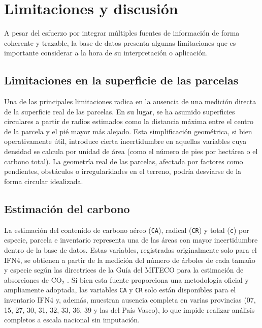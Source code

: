 \section{Limitaciones y discusión}



A pesar del esfuerzo por integrar múltiples fuentes de información de forma coherente y trazable, la base de datos presenta algunas limitaciones que es importante considerar a la hora de su interpretación o aplicación.

\subsection*{Limitaciones en la superficie de las parcelas}

Una de las principales limitaciones radica en la ausencia de una medición directa de la superficie real de las parcelas. En su lugar, se ha asumido superficies circulares a partir de radios estimados como la distancia máxima entre el centro de la parcela y el pié mayor más alejado. Esta simplificación geométrica, si bien operativamente útil, introduce cierta incertidumbre en aquellas variables cuya densidad se calcula por unidad de área (como el número de pies por hectárea o el carbono total). La geometría real de las parcelas, afectada por factores como pendientes, obstáculos o irregularidades en el terreno, podría desviarse de la forma circular idealizada.

\subsection*{Estimación del carbono}

La estimación del contenido de carbono aéreo (\texttt{CA}), radical (\texttt{CR}) y total (\texttt{c}) por especie, parcela e inventario representa una de las áreas con mayor incertidumbre dentro de la base de datos. Estas variables, registradas originalmente solo para el IFN4, se obtienen a partir de la medición del número de árboles de cada tamaño y especie según las directrices de la Guía del MITECO para la estimación de absorciones de CO$_2$ \cite{miteco_guia_co2}. Si bien esta fuente proporciona una metodología oficial y ampliamente adoptada, las variables \texttt{CA} y \texttt{CR} solo están disponibles para el inventario IFN4 y, además, muestran ausencia completa en varias provincias (07, 15, 27, 30, 31, 32, 33, 36, 39 y las del País Vasco), lo que impide realizar análisis completos a escala nacional sin imputación.


